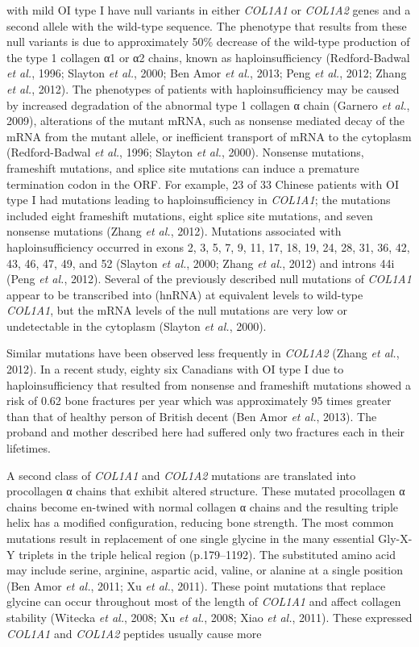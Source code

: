 with mild OI type I have null variants in either \textit{COL1A1} or \textit{COL1A2} genes and a second allele with the wild-type sequence. The phenotype that results from these null variants is due to approximately 50\% decrease of the wild-type production of the type 1 collagen α1 or α2 chains, known as haploinsufficiency (Redford-Badwal \textit{et al.}, 1996; Slayton \textit{et al.}, 2000; Ben Amor \textit{et al.}, 2013; Peng \textit{et al.}, 2012; Zhang \textit{et al.}, 2012). The phenotypes of patients with haploinsufficiency may be caused by increased degradation of the abnormal type 1 collagen α chain (Garnero \textit{et al.}, 2009), alterations of the mutant mRNA, such as nonsense mediated decay of the mRNA from the mutant allele, or inefficient transport of mRNA to the cytoplasm (Redford-Badwal \textit{et al.}, 1996; Slayton \textit{et al.}, 2000). Nonsense mutations, frameshift mutations, and splice site mutations can induce a premature termination codon in the ORF. For example, 23 of 33 Chinese patients with OI type I had mutations leading to haploinsufficiency in \textit{COL1A1}; the mutations included eight frameshift mutations, eight splice site mutations, and seven nonsense mutations (Zhang \textit{et al.}, 2012). Mutations associated with haploinsufficiency occurred in exons 2, 3, 5, 7, 9, 11, 17, 18, 19, 24, 28, 31, 36, 42, 43, 46, 47, 49, and 52 (Slayton \textit{et al.}, 2000; Zhang \textit{et al.}, 2012) and introns 44i (Peng \textit{et al.}, 2012). Several of the previously described null mutations of \textit{COL1A1} appear to be transcribed into (hnRNA) at equivalent levels to wild-type \textit{COL1A1}, but the mRNA levels of the null mutations are very low or undetectable in the cytoplasm (Slayton \textit{et al.}, 2000).\par Similar mutations have been observed less frequently in \textit{COL1A2} (Zhang \textit{et al.}, 2012). In a recent study, eighty six Canadians with OI type I due to haploinsufficiency that resulted from nonsense and frameshift mutations showed a risk of 0.62 bone fractures per year which was approximately 95 times greater than that of healthy person of British decent (Ben Amor \textit{et al.}, 2013). The proband and mother described here had suffered only two fractures each in their lifetimes.\par A second class of \textit{COL1A1} and \textit{COL1A2} mutations are translated into procollagen α chains that exhibit altered structure. These mutated procollagen α chains become en-twined with normal collagen α chains and the resulting triple helix has a modified configuration, reducing bone strength. The most common mutations result in replacement of one single glycine in the many essential Gly-X-Y triplets in the triple helical region (p.179–1192). The substituted amino acid may include serine, arginine, aspartic acid, valine, or alanine at a single position (Ben Amor \textit{et al.}, 2011; Xu \textit{et al.}, 2011). These point mutations that replace glycine can occur throughout most of the length of \textit{COL1A1} and affect collagen stability (Witecka \textit{et al.}, 2008; Xu \textit{et al.}, 2008; Xiao \textit{et al.}, 2011). These expressed \textit{COL1A1} and \textit{COL1A2} peptides usually cause more 